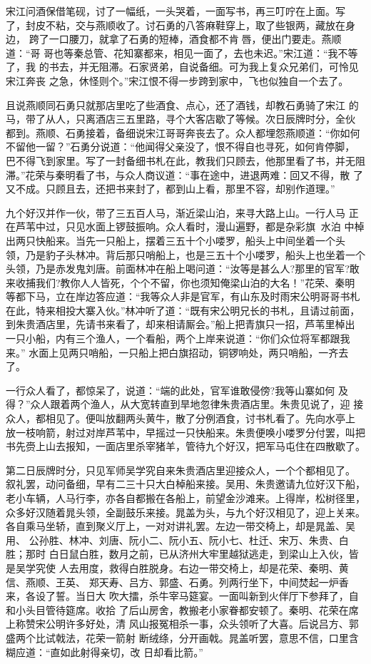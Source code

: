 宋江问酒保借笔砚，讨了一幅纸，一头哭着，一面写书，再三叮咛在上面。写
了，封皮不粘，交与燕顺收了。讨石勇的八答麻鞋穿上，取了些银两，藏放在身边，
跨了一口腰刀，就拿了石勇的短棒，酒食都不肯唇，便出门要走。燕顺道：“哥
哥也等秦总管、花知寨都来，相见一面了，去也未迟。”宋江道：“我不等了，我
的书去，并无阻滞。石家贤弟，自说备细。可为我上复众兄弟们，可怜见宋江奔丧
之急，休怪则个。”宋江恨不得一步跨到家中，飞也似独自一个去了。

且说燕顺同石勇只就那店里吃了些酒食、点心，还了酒钱，却教石勇骑了宋江
的马，带了从人，只离酒店三五里路，寻个大客店歇了等候。次日辰牌时分，全伙
都到。燕顺、石勇接着，备细说宋江哥哥奔丧去了。众人都埋怨燕顺道：“你如何
不留他一留？”石勇分说道：“他闻得父亲没了，恨不得自也寻死，如何肯停脚，
巴不得飞到家里。写了一封备细书札在此，教我们只顾去，他那里看了书，并无阻
滞。”花荣与秦明看了书，与众人商议道：“事在途中，进退两难：回又不得，散
了又不成。只顾且去，还把书来封了，都到山上看，那里不容，却别作道理。”

九个好汉并作一伙，带了三五百人马，渐近梁山泊，来寻大路上山。一行人马
正在芦苇中过，只见水面上锣鼓振响。众人看时，漫山遍野，都是杂彩旗，水泊
中棹出两只快船来。当先一只船上，摆着三五十个小喽罗，船头上中间坐着一个头
领，乃是豹子头林冲。背后那只哨船上，也是三五十个小喽罗，船头上也坐着一个
头领，乃是赤发鬼刘唐。前面林冲在船上喝问道：“汝等是甚么人?那里的官军?敢
来收捕我们?教你人人皆死，个个不留，你也须知俺梁山泊的大名！”花荣、秦明
等都下马，立在岸边答应道：“我等众人非是官军，有山东及时雨宋公明哥哥书札
在此，特来相投大寨入伙。”林冲听了道：“既有宋公明兄长的书札，且请过前面，
到朱贵酒店里，先请书来看了，却来相请厮会。”船上把青旗只一招，芦苇里棹出
一只小船，内有三个渔人，一个看船，两个上岸来说道：“你们众位将军都跟我来。”
水面上见两只哨船，一只船上把白旗招动，铜锣响处，两只哨船，一齐去了。

一行众人看了，都惊呆了，说道：“端的此处，官军谁敢侵傍?我等山寨如何
及得？”众人跟着两个渔人，从大宽转直到旱地忽律朱贵酒店里。朱贵见说了，迎
接众人，都相见了。便叫放翻两头黄牛，散了分例酒食，讨书札看了。先向水亭上
放一枝响箭，射过对岸芦苇中，早摇过一只快船来。朱贵便唤小喽罗分付罢，叫把
书先赍上山去报知，一面店里杀宰猪羊，管待九个好汉，把军马屯住在四散歇了。

第二日辰牌时分，只见军师吴学究自来朱贵酒店里迎接众人，一个个都相见了。
叙礼罢，动问备细，早有二三十只大白棹船来接。吴用、朱贵邀请九位好汉下船，
老小车辆，人马行李，亦各自都搬在各船上，前望金沙滩来。上得岸，松树径里，
众多好汉随着晁头领，全副鼓乐来接。晁盖为头，与九个好汉相见了，迎上关来。
各自乘马坐轿，直到聚义厅上，一对对讲礼罢。左边一带交椅上，却是晁盖、吴用、
公孙胜、林冲、刘唐、阮小二、阮小五、阮小七、杜迁、宋万、朱贵、白胜；那时
白日鼠白胜，数月之前，已从济州大牢里越狱逃走，到梁山上入伙，皆是吴学究使
人去用度，救得白胜脱身。右边一带交椅上，却是花荣、秦明、黄信、燕顺、王英、
郑天寿、吕方、郭盛、石勇。列两行坐下，中间焚起一炉香来，各设了誓。当日大
吹大擂，杀牛宰马筵宴。一面叫新到火伴厅下参拜了，自和小头目管待筵席。收拾
了后山房舍，教搬老小家眷都安顿了。秦明、花荣在席上称赞宋公明许多好处，清
风山报冤相杀一事，众头领听了大喜。后说吕方、郭盛两个比试戟法，花荣一箭射
断绒绦，分开画戟。晁盖听罢，意思不信，口里含糊应道：“直如此射得亲切，改
日却看比箭。”


